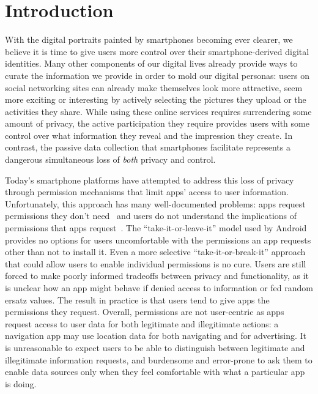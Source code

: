
\section{Introduction} \label{sec-introduction}

With the digital portraits painted by smartphones becoming ever clearer, we
believe it is time to give users more control over their smartphone-derived
digital identities. Many other components of our digital lives already provide
ways to curate the information we provide in order to mold our digital
personas: users on social networking sites can already make themselves look
more attractive, seem more exciting or interesting by actively selecting
the pictures they upload or the activities they share. While using these
online services requires surrendering some amount of privacy, the active
participation they require provides users with some control over what
information they reveal and the impression they create. In contrast, the
passive data collection that smartphones facilitate represents a dangerous
simultaneous loss of \textit{both} privacy and control.


Today's smartphone platforms have attempted to address this loss of privacy
through permission mechanisms that limit apps' access to user information.
Unfortunately, this approach has many well-documented problems: apps request
permissions they don't need~\cite{taintdroid-osdi,demystified-ccs11} and users
do not understand the implications of permissions that apps
request~\cite{androidperms-soups12}. The ``take-it-or-leave-it'' model used by
Android provides no options for users uncomfortable with the permissions an app
requests other than not to install it. Even a more selective
``take-it-or-break-it'' approach~\cite{apex-asiaccs10} that could allow users
to enable individual permissions is no cure. Users are still forced to make
poorly informed tradeoffs between privacy and functionality, as it is unclear
how an app might behave if denied access to information or fed random ersatz
values. The result in practice is that users tend to give apps the permissions
they request. Overall, permissions are not user-centric as apps request access
to user data for both legitimate and illegitimate actions: a navigation app may
use location data for both navigating and for advertising. It is unreasonable
to expect users to be able to distinguish between legitimate and illegitimate
information requests, and burdensome and error-prone to ask them to enable data
sources only when they feel comfortable with what a particular app is doing.

